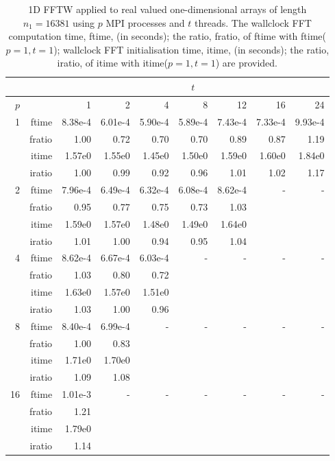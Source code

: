 \documentclass[a4]{article}
\begin{document}
\begin{table}
\begin{center}
\begin{tabular}{|r|r|r|r|r|r|r|r|r|}
\hline 
     &  & \multicolumn{7}{c|}{$t$} \\ \hline
    $p$  &  & 1           & 2    & 4    & 8    & 12   & 16    & 24  \\ \hline\hline
    1  & ftime &  8.38e-4 &  6.01e-4 &  5.90e-4 &  5.89e-4 &  7.43e-4 &  7.33e-4 &  9.93e-4  \\ 
      & fratio & 1.00 &  0.72 &  0.70 &  0.70 &  0.89 &  0.87 &  1.19   \\ 
     & itime & 1.57e0 &   1.55e0 &   1.45e0 &   1.50e0 &   1.59e0 &   1.60e0 &   1.84e0  \\ 
     & iratio & 1.00 &   0.99 &   0.92 &   0.96 &   1.01 &   1.02 &   1.17  \\ \hline
    2  & ftime &  7.96e-4 &  6.49e-4 &  6.32e-4 &  6.08e-4 &  8.62e-4  & - & - \\ 
      & fratio &   0.95 &  0.77 &  0.75 &  0.73 &  1.03   &  &  \\
      & itime &  1.59e0 &   1.57e0 &   1.48e0 &   1.49e0 &   1.64e0   &  &  \\
      & iratio &  1.01 &   1.00 &   0.94 &   0.95 &   1.04  &  &  \\ \hline
    4  & ftime & 8.62e-4 &  6.67e-4 &  6.03e-4   & - & - & - & - \\ 
      & fratio &   1.03 &  0.80 &  0.72  &  &  &  &  \\
      & itime &  1.63e0 &   1.57e0 &   1.51e0   &  & & & \\
      & iratio &  1.03 &   1.00 &   0.96  &  & & &  \\ \hline
    8  & ftime &  8.40e-4 &  6.99e-4    & - & - & - & - & - \\ 
      & fratio & 1.00 &  0.83  &  &  &  &  &  \\
      & itime &  1.71e0 &   1.70e0   &  & & & & \\
      & iratio &  1.09 &   1.08  &  & & & & \\ \hline
    16 & ftime  & 1.01e-3    & - & - & - & - & - & - \\ 
     & fratio &  1.21   &  &  &  &  &  &  \\
      & itime &   1.79e0  & & & & & & \\
      & iratio & 1.14   & & & & & & \\ \hline
\end{tabular}
\caption{1D FFTW applied to real valued one-dimensional arrays of length $n_1=16381$ using $p$ MPI processes and $t$ threads. The wallclock FFT computation time, ftime, (in seconds); the ratio, fratio, of ftime  with ftime($p=1,t=1$); wallclock FFT initialisation time, itime, (in seconds); the ratio, iratio, of itime  with itime($p=1,t=1$) are provided. }\label{Tbl:FFT1d16381}
\end{center}
\end{table}
\end{document}
